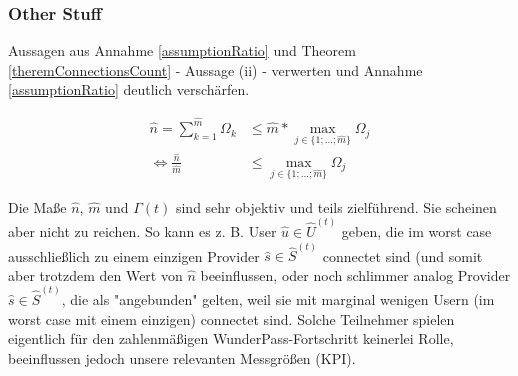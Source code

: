 \vspace{1cm}












\vspace{1cm}

\subsubsection{Other Stuff}
\label{sec:eco_zahlen_zustand_todo}

\vspace{2cm}
\vspace{0.3cm}

Aussagen aus Annahme \ref{assumptionRatio} und Theorem \ref{theremConnectionsCount} - Aussage (ii) - verwerten und Annahme \ref{assumptionRatio} deutlich verschärfen.

\vspace{0.3cm}

\begin{align*}
\widehat{n} = \sum_{k=1}^{\widehat{m}} \Omega_k &\leq \widehat{m} * \max_{j \in \{1;...;\widehat{m}\}} \Omega_j \\
\Leftrightarrow \frac{\widehat{n}}{\widehat{m}} &\leq \max_{j \in \{1;...;\widehat{m}\}} \Omega_j
\end{align*}
\vspace{0.3cm}

\vspace{1cm}


\todo{[TODO3]["Verdichtung"]}
\vspace{0.3cm}

Die Maße $\widehat{n}$, $\widehat{m}$ und $\Gamma(t)$ sind sehr objektiv und teils zielführend. Sie scheinen aber nicht zu reichen. So kann es z. B. User $\widehat{u} \in \widehat{U}^{(t)}$ geben, die im worst case ausschließlich zu einem einzigen Provider $\widehat{s} \in \widehat{S}^{(t)}$ connectet sind (und somit aber trotzdem den Wert von $\widehat{n}$ beeinflussen, oder noch schlimmer analog Provider $\widehat{s} \in \widehat{S}^{(t)}$, die als "angebunden" gelten, weil sie mit marginal wenigen Usern (im worst case mit einem einzigen) connectet sind. Solche Teilnehmer spielen eigentlich für den zahlenmäßigen WunderPass-Fortschritt keinerlei Rolle, beeinflussen jedoch unsere relevanten Messgrößen (KPI).

